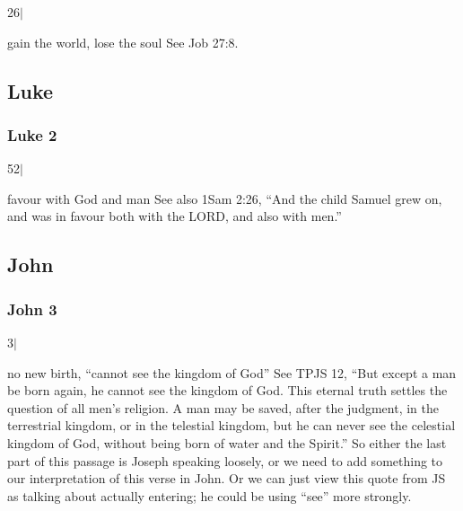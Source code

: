 		\begin{compactdesc}
		
		\item[26$\vert$]
		\begin{compactdesc}
		\item[gain the world, lose the soul] See Job 27:8.
		\end{compactdesc}
		
		\end{compactdesc}

\subsection{Luke} %

	\subsubsection{Luke 2} %

		\begin{compactdesc}

		\item[52$\vert$]
		\begin{compactdesc}
		\item[favour with God and man] See also 1Sam 2:26, ``And the child Samuel grew on, and was in favour both with the LORD, and also with men.''
		\end{compactdesc}

		\end{compactdesc}
		
\subsection{John} %

	\subsubsection{John 3} %
	
		\begin{compactdesc}
		
		\item[3$\vert$]
		\begin{compactdesc}
		\item[no new birth, ``cannot see the kingdom of God''] See TPJS 12, ``But except a man be born again, he cannot see the kingdom of God. This eternal truth settles the question of all men's religion. A man may be saved, after the judgment, in the terrestrial kingdom, or in the telestial kingdom, but he can never see the celestial kingdom of God, without being born of water and the Spirit.'' So either the last part of this passage is Joseph speaking loosely, or we need to add something to our interpretation of this verse in John. Or we can just view this quote from JS as talking about actually entering; he could be using ``see'' more strongly.
		\end{compactdesc}
		
		\end{compactdesc}
		
